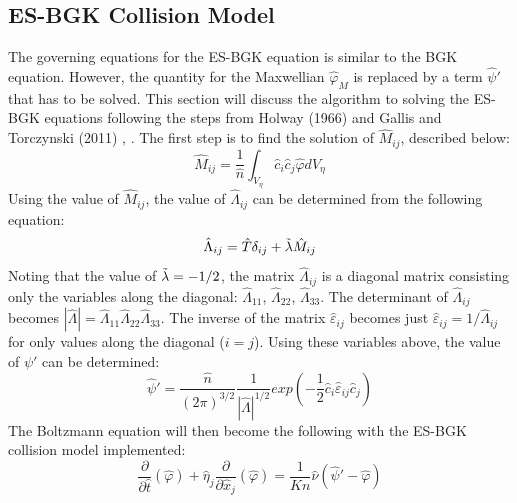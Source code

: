 \documentclass[a4paper]{article}
\begin{document}
\subsection{ES-BGK Collision Model}
The governing equations for the ES-BGK equation is similar to the BGK equation. However, the quantity for the Maxwellian $\hat{\varphi}_M$ is replaced by a term $\hat{\psi} '$ that has to be solved. This section will discuss the algorithm to solving the ES-BGK equations following the steps from Holway (1966) and Gallis and Torczynski (2011) \cite{holway1966new}, \cite{gallis2011investigation}. The first step is to find the solution of $\hat{M}_{ij}$, described below:
\begin{equation}
    \hat{M}_{ij} = \dfrac{1}{\hat{n}} {\int_{V_{\eta}}} \hat{c}_{i} \hat{c}_{j} \hat{\varphi}dV_{\eta}
\end{equation}
Using the value of $\hat{M}_{ij}$, the value of $\hat{\Lambda}_{ij}$ can be determined from the following equation:
\begin{equation}
   \hat{\Lambda}_{ij} = \hat{T}\delta_{ij} + \Tilde{\lambda}\hat{M}_{ij} 
\end{equation}
Noting that the value of $\Tilde{\lambda} = -1/2$, the matrix $\hat{\Lambda}_{ij}$ is a diagonal matrix consisting only the variables along the diagonal: $\hat{\Lambda}_{11}$, $\hat{\Lambda}_{22}$, $\hat{\Lambda}_{33}$. The determinant of $\hat{\Lambda}_{ij}$ becomes $|\hat{\Lambda}| = \hat{\Lambda}_{11}\hat{\Lambda}_{22}\hat{\Lambda}_{33}$. The inverse of the matrix $\hat{\varepsilon}_{ij}$ becomes just $\hat{\varepsilon}_{ij} = 1/\hat{\Lambda}_{ij}$ for only values along the diagonal ($i=j$). Using these variables above, the value of $\psi '$ can be determined:
\begin{equation}
    \hat{\psi} ' = \dfrac{\hat{n}}{(2\pi)^{3/2}} \dfrac{1}{|\hat{\Lambda}|^{1/2}} exp\left(-\dfrac{1}{2}\hat{c}_i \hat{\varepsilon}_{ij} \hat{c}_j \right)
\end{equation}
The Boltzmann equation will then become the following with the ES-BGK collision model implemented:
\begin{equation}
    \dfrac{\partial}{\partial \hat{t}}(\hat{\varphi}) + \hat{\eta}_j \dfrac{\partial}{\partial \hat{x}_j} (\hat{\varphi})  = \dfrac{1}{Kn}\hat{\nu} (\hat{\psi} ' - \hat{\varphi})
\end{equation}
\end{document}
